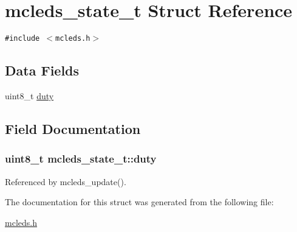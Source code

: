 \hypertarget{structmcleds__state__t}{
\section{mcleds\_\-state\_\-t Struct Reference}
\label{structmcleds__state__t}
}
{\tt \#include $<$mcleds.h$>$}

\subsection*{Data Fields}
\begin{CompactItemize}
\item 
uint8\_\-t \hyperlink{structmcleds__state__t_a7381585349ba59b5d61a3d8b1a0187e}{duty}
\end{CompactItemize}


\subsection{Field Documentation}
\hypertarget{structmcleds__state__t_a7381585349ba59b5d61a3d8b1a0187e}{
\subsubsection{\setlength{\rightskip}{0pt plus 5cm}uint8\_\-t {\bf mcleds\_\-state\_\-t::duty}}}
\label{structmcleds__state__t_a7381585349ba59b5d61a3d8b1a0187e}




Referenced by mcleds\_\-update().

The documentation for this struct was generated from the following file:\begin{CompactItemize}
\item 
\hyperlink{mcleds_8h}{mcleds.h}\end{CompactItemize}
